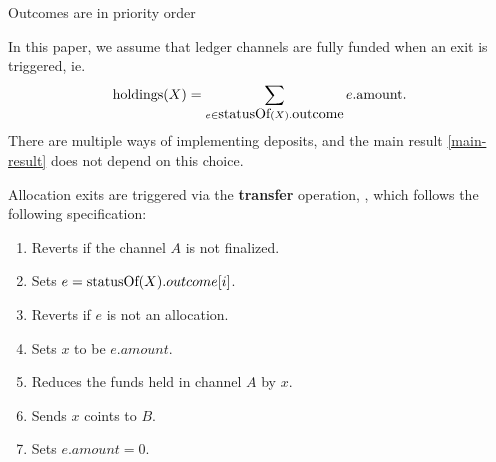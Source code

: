 Outcomes are in priority order%



In this paper, we assume that ledger channels are fully funded when an exit is triggered, ie. $$\mbox{holdings}(X) = \sum_{e\in \mbox{statusOf}(X).\mbox{outcome}} e.\mbox{amount}.$$ There are multiple ways of implementing deposits, and the main result \ref{main-result} does not depend on this choice.

Allocation exits are triggered via the \textbf{transfer} operation, , which follows the following specification:
\begin{enumerate}
  \item Reverts if the channel $A$ is not finalized.
  \item Sets $e = \mbox{statusOf}(X).outcome[i]$.
  \item Reverts if $e$ is not an allocation.
  \item Sets $x$ to be $e.amount$.
  \item Reduces the funds held in channel $A$ by $x$. 
  \item Sends $x$ coints to $B$.
  \item Sets $e.amount = 0$.
\end{enumerate} 

